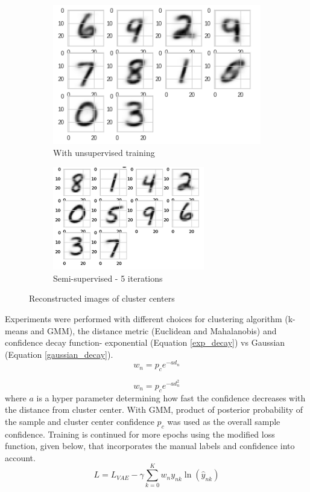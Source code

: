 \documentclass[runningheads]{llncs}
\begin{document}
\begin{figure}[!t]
\centering
\begin{subfigure}[t]{.45\textwidth}
  \centering
  \includegraphics[width=.5\linewidth]{cluster_centers_epoch_1_0_gmm.png}
  \caption{With unsupervised training}
  \label{cluster_center_1}
\end{subfigure}\hfill
\begin{subfigure}[t]{.45\textwidth}
  \centering
  \includegraphics[width=.5\linewidth]{cluster_centers_epoch_5_0_gmm.png}
  \caption{Semi-supervised - 5 iterations}
  \label{cluster_center_5}
\end{subfigure}
\caption{Reconstructed images of cluster centers}
\label{cluster_center}
\end{figure}

Experiments were performed with different choices for  clustering algorithm (k-means and GMM), the distance metric (Euclidean and Mahalanobis) and confidence decay function- exponential (Equation \ref{exp_decay}) vs Gaussian (Equation \ref{gaussian_decay}).
\begin{equation}
    w_n = p_ce^{-a d_n}
    \label{exp_decay}
\end{equation}

\vspace{-0.2in}
\begin{equation}
    w_n = p_ce^{-a d_n^2}
    \label{gaussian_decay}
\end{equation}
where $a$ is a hyper parameter determining how fast the confidence decreases with the distance from cluster center.
With GMM, product of posterior probability of the sample and cluster center confidence $p_c$ was used as the overall sample confidence.
Training is continued for more epochs using the modified loss function, given below, that incorporates the manual labels and confidence into account.
\begin{equation} \label{semi_supervised_loss}
L = L_{VAE}  - \gamma \sum_{k=0}^{K}w_{n}y_{nk}\ln(\hat{y}_{nk})
\end{equation}
\end{document}
